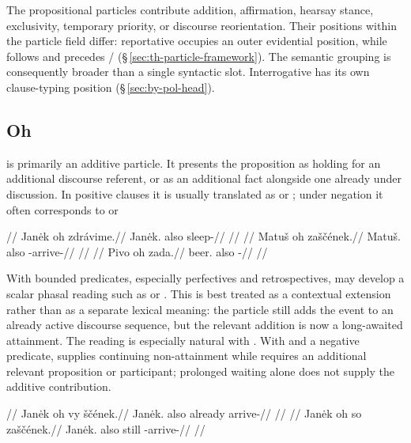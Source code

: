The propositional particles contribute addition, affirmation, hearsay stance,
exclusivity, temporary priority, or discourse reorientation. Their positions
within the particle field differ: reportative  occupies an outer
evidential position, while  follows  and precedes
/ (§\,\ref{sec:th-particle-framework}). The semantic
grouping is consequently broader than a single syntactic slot. Interrogative
 has its own clause-typing
position (§\,\ref{sec:by-pol-head}).

\subsection{Oh}  is primarily an additive particle. It presents the
proposition as holding for an additional discourse referent, or as an
additional fact alongside one already under discussion. In positive clauses it
is usually translated as  or ; under negation it often
corresponds to  or 

\pex
\a
\begingl
\glpreamble {}//
\gla Janėk oh zdrávime.//
\glb Janėk.\Dir{} also sleep-\Prog{}//
\glft {}//
\endgl
\a
\begingl
\glpreamble {}//
\gla Matuš oh zaščének.//
\glb Matuš.\Dir{} also \Neg{}-arrive-\Pf{}//
\glft {}//
\endgl
\a
\begingl
\glpreamble {}//
\gla Pivo oh zada.//
\glb beer.\Dir{} also \NegExst{}-\Cont{}//
\glft {}//
\endgl
\xe

With bounded predicates, especially perfectives and retrospectives,
 may develop a scalar phasal reading such as  or
. This is best treated as a contextual extension rather than as a
separate lexical meaning: the particle still adds the event to an already
active discourse sequence, but the relevant addition is now a long-awaited
attainment. The reading is especially natural with . With  and a
negative predicate,  supplies continuing non-attainment while
 requires an additional relevant proposition or participant; prolonged
waiting alone does not supply the additive contribution.

\pex
\a
\begingl
\glpreamble {}//
\gla Janėk oh vy ščének.//
\glb Janėk.\Dir{} also already arrive-\Pf{}//
\glft {}//
\endgl
\a
\begingl
\glpreamble {}//
\gla Janėk oh so zaščének.//
\glb Janėk.\Dir{} also still \Neg{}-arrive-\Pf{}//
\glft {}//
\endgl
\xe

